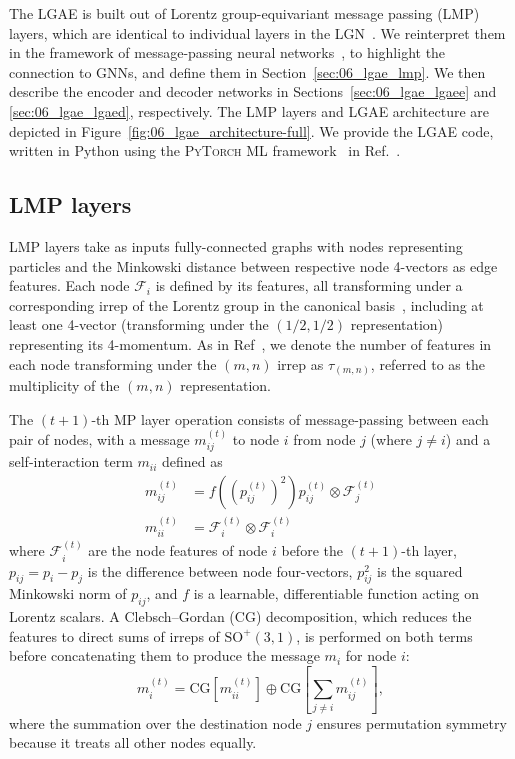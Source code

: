 The LGAE is built out of Lorentz group-equivariant message passing (LMP) layers, which are identical to individual layers in the LGN~\cite{bogatskiy2020lorentz}.
We reinterpret them in the framework of message-passing neural networks~\cite{gilmer2017neural}, to highlight the connection to GNNs, and define them in Section~\ref{sec:06_lgae_lmp}.
We then describe the encoder and decoder networks in Sections~\ref{sec:06_lgae_lgaee} and \ref{sec:06_lgae_lgaed}, respectively.
The LMP layers and LGAE architecture are depicted in Figure~\ref{fig:06_lgae_architecture-full}.
We provide the LGAE code, written in Python using the \textsc{PyTorch} ML framework~\cite{pytorch} in Ref.~\cite{LGAE_code}.

\subsection{LMP layers \label{sec:06_lgae_lmp}}

LMP layers take as inputs fully-connected graphs with nodes representing particles and the Minkowski distance between respective node 4-vectors as edge features. 
Each node $\mathcal{F}_i$ is defined by its features, all transforming under a corresponding irrep of the Lorentz group in the canonical basis~\cite{gelfand2018representations}, including at least one 4-vector (transforming under the $(1/2, 1/2)$ representation) representing its 4-momentum.
As in Ref~\cite{bogatskiy2020lorentz}, we denote the number of features in each node transforming under the $(m, n)$ irrep as $\tau_{(m,n)}$, referred to as the multiplicity of the $(m,n)$ representation. 

The $(t+1)$-th MP layer operation consists of message-passing between each pair of nodes, with a message $m_{i j}^{(t)}$ to node $i$ from node $j$ (where $j \neq i$) and a self-interaction term $m_{ii}$ defined as
\begin{align} \label{eq:06_lgae_msg}
        m_{i j}^{(t)} &= f\left( \left(p_{ij}^{(t)}\right)^2 \right) p_{ij}^{(t)} \otimes \mathcal{F}_j^{(t)} \\ 
        m_{i i}^{(t)} &= \mathcal{F}_i^{(t)} \otimes \mathcal{F}_i^{(t)}
\end{align}
where $\mathcal{F}_{i}^{(t)}$ are the node features of node $i$ before the $(t+1)$-th layer, $p_{ij} = p_i - p_j$ is the difference between node four-vectors, $p_{ij}^2$ is the squared Minkowski norm of $p_{i j}$, and $f$ is a learnable, differentiable function acting on Lorentz scalars. 
A Clebsch--Gordan (CG) decomposition, which reduces the features to direct sums of irreps of $\mathrm{SO}^+(3,1)$, is performed on both terms before concatenating them to produce the message $m_i$ for node $i$:
\begin{equation}
    m_i^{(t)} = 
    \mathrm{CG}\left[
    m_{i i}^{(t)}
    \right]
    \oplus
    \mathrm{CG}\left[
    \sum_{j\neq i} m_{i j}^{(t)}
    \right], 
\end{equation}
where the summation over the destination node $j$ ensures permutation symmetry because it treats all other nodes equally. 

